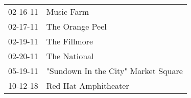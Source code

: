 \begin{supertabular}{p{0.25\columnwidth}p{0.75\columnwidth}}
 02-16-11 &                           Music Farm \\
 02-17-11 &                      The Orange Peel \\
 02-19-11 &                         The Fillmore \\
 02-20-11 &                         The National \\
 05-19-11 &  "Sundown In the City" Market Square \\
 10-12-18 &                 Red Hat Amphitheater \\
\end{supertabular}
